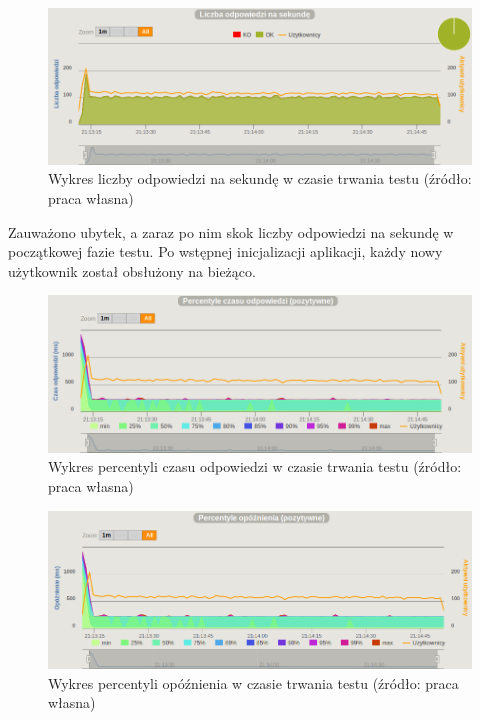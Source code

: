 \documentclass[12pt,twoside]{article}
\begin{document}
\begin{figure}[htbp]
\centering
\includegraphics[resolution=150]{test_results/java/matrix/screenshots/responses.png}
\caption{Wykres liczby odpowiedzi na sekundę w czasie trwania testu (źródło: praca własna)}
\end{figure}

Zauważono ubytek, a zaraz po nim skok liczby odpowiedzi na sekundę w
początkowej fazie testu. Po wstępnej inicjalizacji aplikacji, każdy nowy
użytkownik został obsłużony na bieżąco.

\begin{figure}[htbp]
\centering
\includegraphics[resolution=150]{test_results/java/matrix/screenshots/response_percentile.png}
\caption{Wykres percentyli czasu odpowiedzi w czasie trwania testu (źródło: praca własna)}
\end{figure}

\begin{figure}[htbp]
\centering
\includegraphics[resolution=150]{test_results/java/matrix/screenshots/latency_percentile.png}
\caption{Wykres percentyli opóźnienia w czasie trwania testu (źródło: praca własna)}
\end{figure}
\end{document}
